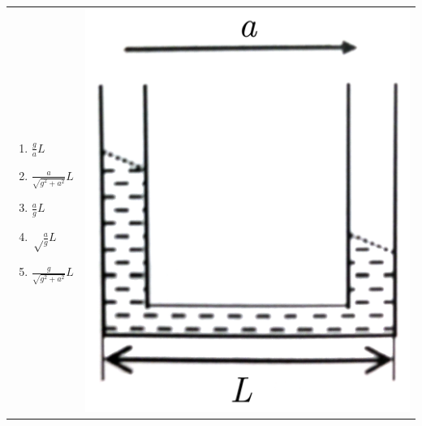 \documentclass[12pt,letterpaper]{article}
\begin{document}
\begin{enumerate}[resume]
\begin{tabular}{l r}
\begin{minipage}{0.7\textwidth}
\begin{enumerate}
\item $\displaystyle \frac{g}{a}L$
\item $\displaystyle \frac{a}{\sqrt{g^2+a^2}}L$
\item $\displaystyle \frac{a}{g}L$
\item $\displaystyle \sqrt\frac{a}{g}L$
\item $\displaystyle \frac{g}{\sqrt{g^2+a^2}}L$
\end{enumerate}
\end{minipage} &
\begin{minipage}{0.2\textwidth}
\includegraphics[width=\textwidth]{utube.png}
\end{minipage}
\end{tabular}


\end{enumerate}
\end{document}
